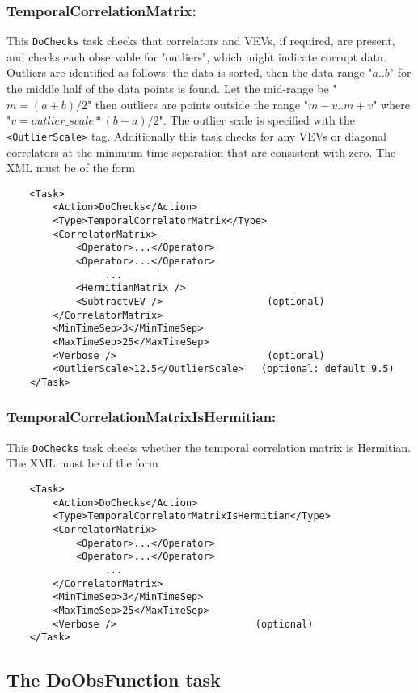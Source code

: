 \documentclass[12pt]{article}
\newcommand{\vb}{\texttt}
\begin{document}
\subsubsection{TemporalCorrelationMatrix:}
This \vb{DoChecks} task checks that correlators and VEVs, if required, are present,
and checks each observable for "outliers", which might indicate corrupt data.
Outliers are identified as follows: the data is sorted, then the data range "$a..b$"
for the middle half of the data points is found. 
Let the mid-range be "$m=(a+b)/2$" then outliers are points outside the range
"$m-v .. m+v$"  where "$v = outlier\_scale * (b-a)/2$".
The outlier scale is specified with the \vb{<OutlierScale>} tag.
Additionally this task checks for any VEVs or diagonal correlators
at the minimum time separation that are consistent with zero.
The XML must be of the form
\begin{verbatim}
    <Task>
        <Action>DoChecks</Action>
        <Type>TemporalCorrelatorMatrix</Type>
        <CorrelatorMatrix>
            <Operator>...</Operator>
            <Operator>...</Operator>
                 ...
            <HermitianMatrix />
            <SubtractVEV />                  (optional)
        </CorrelatorMatrix>
        <MinTimeSep>3</MinTimeSep>
        <MaxTimeSep>25</MaxTimeSep>
        <Verbose />                          (optional)
        <OutlierScale>12.5</OutlierScale>   (optional: default 9.5)
    </Task>  
\end{verbatim}

\subsubsection{TemporalCorrelationMatrixIsHermitian:}
This \vb{DoChecks} task checks whether the temporal correlation matrix is Hermitian.
The XML must be of the form
\begin{verbatim}
    <Task>
        <Action>DoChecks</Action>
        <Type>TemporalCorrelatorMatrixIsHermitian</Type>
        <CorrelatorMatrix>
            <Operator>...</Operator>
            <Operator>...</Operator>
                 ...
        </CorrelatorMatrix>
        <MinTimeSep>3</MinTimeSep>
        <MaxTimeSep>25</MaxTimeSep>
        <Verbose />                        (optional) 
    </Task>
\end{verbatim}

\subsection{The DoObsFunction task}
\end{document}
